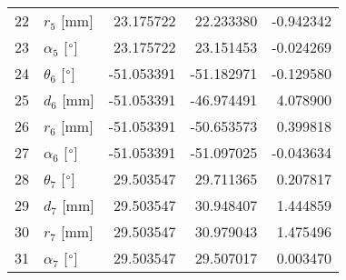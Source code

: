 \documentclass{standalone}%
\begin{document}
\begin{tabular}{llrrr}
22 &              $r_{5}$ [mm] &  23.175722 &  22.233380 &  -0.942342 \\
23 &  $\alpha_{5}$ [$\degree$] &  23.175722 &  23.151453 &  -0.024269 \\
24 &  $\theta_{6}$ [$\degree$] & -51.053391 & -51.182971 &  -0.129580 \\
25 &              $d_{6}$ [mm] & -51.053391 & -46.974491 &   4.078900 \\
26 &              $r_{6}$ [mm] & -51.053391 & -50.653573 &   0.399818 \\
27 &  $\alpha_{6}$ [$\degree$] & -51.053391 & -51.097025 &  -0.043634 \\
28 &  $\theta_{7}$ [$\degree$] &  29.503547 &  29.711365 &   0.207817 \\
29 &              $d_{7}$ [mm] &  29.503547 &  30.948407 &   1.444859 \\
30 &              $r_{7}$ [mm] &  29.503547 &  30.979043 &   1.475496 \\
31 &  $\alpha_{7}$ [$\degree$] &  29.503547 &  29.507017 &   0.003470 \\
\bottomrule
\end{tabular}
%
\end{document}
